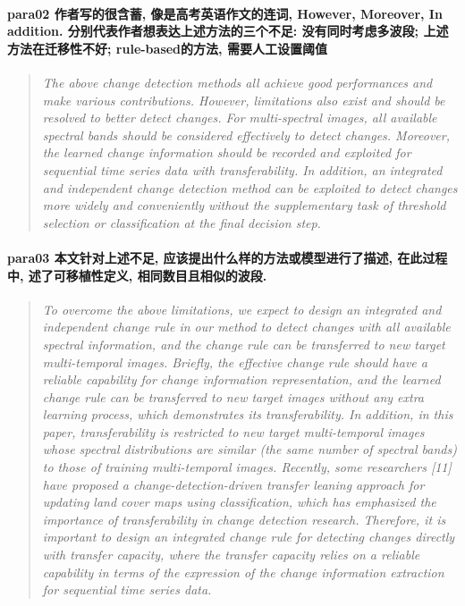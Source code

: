 \paragraph*{para02
    \textcolor[RGB]{17, 205, 29}{作者写的很含蓄, 像是高考英语作文的连词, However, Moreover, In addition. 分别代表作者想表达上述方法的三个不足: 没有同时考虑多波段; 上述方法在迁移性不好; rule-based的方法, 需要人工设置阈值}}
\begin{quotation}
    \itshape
    The above change detection methods all achieve good performances and make various contributions. However, limitations also exist and should be resolved to better detect changes. For multi-spectral images, all available spectral bands should be considered effectively to detect changes. Moreover, the learned change information should be recorded and exploited for sequential time series data with transferability. In addition, an integrated and independent change detection method can be exploited to detect changes more widely and conveniently without the supplementary task of threshold selection or classification at the final decision step.
\end{quotation}

\paragraph*{para03
    \textcolor[RGB]{17, 205, 29}{本文针对上述不足, 应该提出什么样的方法或模型进行了描述, 在此过程中, 述了可移植性定义, 相同数目且相似的波段. }}
\begin{quotation}
    \itshape
    To overcome the above limitations, we expect to design an integrated and independent change rule in our method to detect changes with all available spectral information, and the change rule can be transferred to new target multi-temporal images. Briefly, the effective change rule should have a reliable capability for change information representation, and the learned change rule can be transferred to new target images without any extra learning process, which demonstrates its transferability. In addition, in this paper, transferability is restricted to new target multi-temporal images whose spectral distributions are similar (the same number of spectral bands) to those of training multi-temporal images. Recently, some researchers [11] have proposed a change-detection-driven transfer leaning approach for updating land cover maps using classification, which has emphasized the importance of transferability in change detection research. Therefore, it is important to design an integrated change rule for detecting changes directly with transfer capacity, where the transfer capacity relies on a reliable capability in terms of the expression of the change information extraction for sequential time series data. 
\end{quotation}

